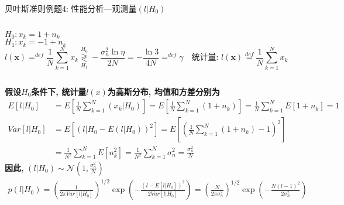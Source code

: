 \begin{frame}[shrink]{贝叶斯准则例题4: 性能分析---观测量$(l|H_0)$}
\begin{columns}
	$H_0:x_k=1+n_k$\\
	$H_1:x_k=-1+n_k$
	\[
	l(\bm{x})\mathop{=}^{def}\frac{1}{N}\sum\limits_{k=1}^{N}x_k\mathop{\gtrless}\limits_{H_1}^{H_0}-\frac{\sigma_n^2\ln\eta}{2N}=-\frac{\ln3}{4N}\mathop{=}^{def}\gamma \quad \textbf{统计量: }l(\bm{x})\mathop{=}\limits^{def}\frac{1}{N}\sum\limits_{k=1}^{N}x_k
	\]
\end{columns}
\textbf{假设$H_0$条件下, 统计量$l(x)$为高斯分布, 均值和方差分别为}
\begin{align*}
E[l|H_0]&=E\left[\frac{1}{N}\sum\limits_{k=1}^{N}(x_k|H_0)\right]=E\left[\frac{1}{N}\sum\limits_{k=1}^{N}(1+n_k)\right]=\frac{1}{N}\sum\limits_{k=1}^{N}E[1+n_k]=1\\
Var[l|H_0]&=E\left[(l|H_0-E(l|H_0))^2\right]=E\left[\left(\frac{1}{N}\sum\limits_{k=1}^{N}(1+n_k)-1\right)^2\right]\\
&=\frac{1}{N^2}\sum\limits_{k=1}^{N}E[n_k^2]=\frac{1}{N^2}\sum\limits_{k=1}^{N}\sigma_n^2=\frac{\sigma_n^2}{N}
\end{align*}
\textbf{因此, }$(l|H_0)\sim\mathcal{N}(1,\frac{\sigma_n^2}{N})$
\begin{align*}
p(l|H_0)=\left(\frac{1}{2\pi Var[l|H_0]}\right)^{1/2}\exp\left(-\frac{(l-E[l|H_0])^2}{2 Var[l|H_0]}\right)=\left(\frac{N}{2\pi\sigma_n^2}\right)^{1/2}\exp\left(-\frac{N(l-1)^2}{2\sigma_n^2}\right)
\end{align*}
\end{frame}

